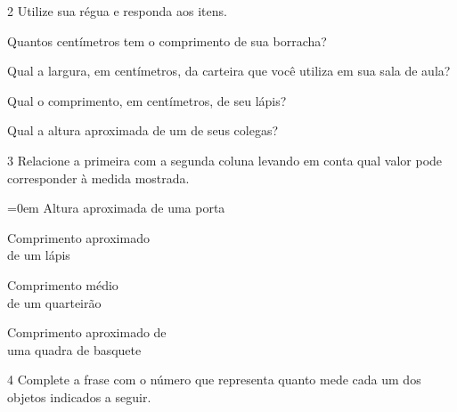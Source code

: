 \num{2} Utilize sua régua e responda aos itens.

\begin{escolha}
\item Quantos centímetros tem o comprimento de sua borracha?

\item Qual a largura, em centímetros, da carteira que você utiliza em sua sala de aula?

\item Qual o comprimento, em centímetros, de seu lápis?

\item Qual a altura aproximada de um de seus colegas?
\end{escolha}


\num{3} Relacione a primeira com a segunda coluna levando em conta qual valor
pode corresponder à medida mostrada.

\begin{multicols}{2}\parindent=0em
Altura aproximada de uma porta\bigskip

Comprimento aproximado\\
de um lápis\bigskip

Comprimento médio\\
de um quarteirão\bigskip

Comprimento aproximado de\\
uma quadra de basquete

\columnbreak

\blue{20 cm}\bigskip

\bigskip

\bigskip

\end{multicols}


\num{4} Complete a frase com o número que representa quanto mede cada um dos
objetos indicados a seguir.

